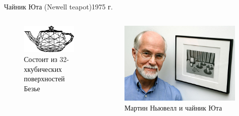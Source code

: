 \documentclass{beamer}
\begin{document}
\begin{frame}{Чайник Юта (Newell teapot)}{1975 г.}
	
		\begin{columns}
		\begin{column}{0.5\textwidth}
			\begin{figure} 
				\includegraphics[width=\textwidth]{images/Utah_teapot_model.png}
				\caption {Состоит из 32-хкубических поверхностей Безье}
			\end{figure}
		\end{column}
		\begin{column}{0.5\textwidth}
			\begin{figure} 
				\includegraphics[width=\textwidth]{images/Utah_teapot_and_Newell.png}
				\caption {Мартин Ньювелл и чайник Юта}
			\end{figure}
		\end{column}
	\end{columns}
	
\end{frame}
\end{document}
